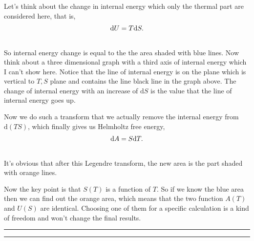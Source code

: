 \documentclass[letterpaper,10pt,english]{sphinxmanual}
\begin{document}
Let's think about the change in internal energy which only the thermal part are considered here, that is,
\begin{gather}
\begin{split}\mathrm d U = T \mathrm d S  .\end{split}\notag\\\begin{split}\end{split}\notag
\end{gather}
So internal energy change is equal to the the area shaded with blue lines. Now think about a three dimensional graph with a third axis of internal energy which I can't show here. Notice that the line of internal energy is on the plane which is vertical to ${T, S}$ plane and contains the line black line in the graph above. The change of internal energy with an increase of $\mathrm dS$ is the value that the line of internal energy goes up.

Now we do such a transform that we actually remove the internal energy from $\mathrm d ( T S )$, which finally gives us Helmholtz free energy,
\begin{gather}
\begin{split}\mathrm d A = S \mathrm d T .\end{split}\notag\\\begin{split}\end{split}\notag
\end{gather}
It's obvious that after this Legendre transform, the new area is the part shaded with orange lines.

Now the key point is that $S(T)$ is a function of $T$. So if we know the blue area then we can find out the orange area, which means that the two function $A(T)$ and $U(S)$ are identical. Choosing one of them for a specific calculation is a kind of freedom and won't change the final results.


\bigskip\hrule{}\bigskip



\bigskip\hrule{}\bigskip
\end{document}
